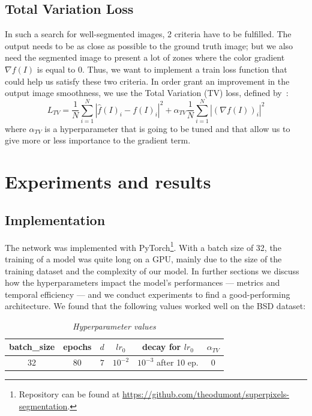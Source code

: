 \documentclass{article}
\begin{document}
    \subsection{Total Variation Loss}
        In such a search for well-segmented images, 2 criteria have to be fulfilled. The output needs to be as close as possible to the ground truth image; but we also need the segmented image to present a lot of zones where the color gradient $\nabla f(I)$ is equal to $0$. Thus, we want to implement a train loss function that could help us satisfy these two criteria.
        In order grant an improvement in the output image smoothness, we use the Total Variation (TV) loss, defined by~\cite{tvloss}:
        $$
        L_{TV}=\frac{1}{N}\sum_{i=1}^N |\hat{f}(I)_i-f(I)_i|^2+\alpha_{TV}\frac{1}{N}\sum_{i=1}^N|(\nabla f(I))_i|^2
        $$
        where $\alpha_{TV}$ is a hyperparameter that is going to be tuned and that allow us to give more or less importance to the gradient term.

\section{Experiments and results}
    \subsection{Implementation}
        The network was implemented with PyTorch\footnote{Repository can be found at \url{https://github.com/theodumont/superpixels-segmentation}.}. With a batch size of 32, the training of a model was quite long on a GPU, mainly due to the size of the training dataset and the complexity of our model. In further sections we discuss how the hyperparameters impact the model's performances --- metrics and temporal efficiency --- and we conduct experiments to find a good-performing architecture. We found that the following values worked well on the BSD dataset:
        \begin{table}[!ht]
            \centering
            \begin{tabular}{|c|c|c|c|c|c|}
                \hline
                batch\_size & epochs & $d$ & $lr_0$ & decay for $lr_0$ & $\alpha_{TV}$ \\
                \hline
                \hline
                32 & 80 & $7$ & $10^{-2}$ & $10^{-3}$ after 10 ep. & 0 \\
                \hline
            \end{tabular}
            \caption{\textit{Hyperparameter values}}
        \end{table}
\end{document}
